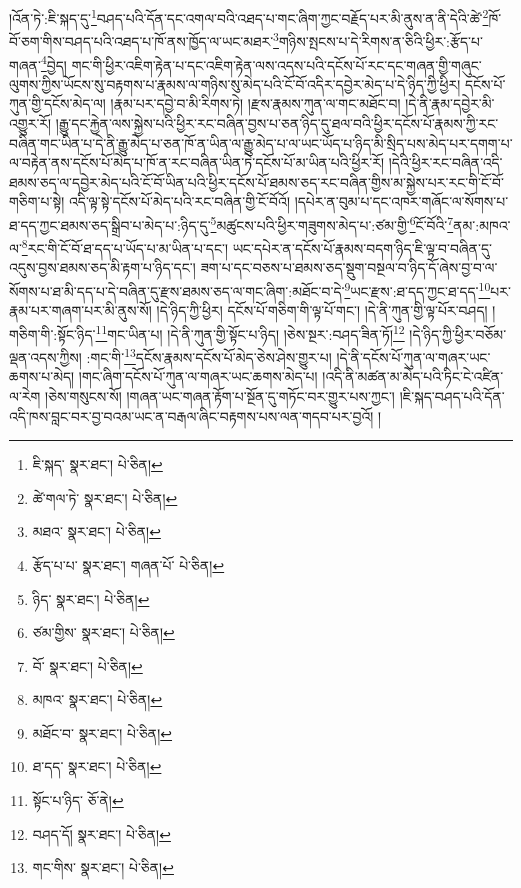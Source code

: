 །འོན་ཏེ་:ཇི་སྐད་དུ་\footnote{ཇི་སྐད་  སྣར་ཐང་།  པེ་ཅིན། }བཤད་པའི་དོན་དང་འགལ་བའི་འཐད་པ་གང་ཞིག་ཀྱང་བརྗོད་པར་མི་ནུས་ན་ནི་དེའི་ཚེ་\footnote{ཚེ་གལ་ཏེ་  སྣར་ཐང་།  པེ་ཅིན། }ཁོ་བོ་ཅག་གིས་བཤད་པའི་འཐད་པ་ཁོ་ནས་ཁྱོད་ལ་ཡང་མཐར་\footnote{མཐའ་  སྣར་ཐང་།  པེ་ཅིན། }གཉིས་སྤངས་པ་དེ་རིགས་ན་ཅིའི་ཕྱིར་:རྩོད་པ་གཞན་\footnote{རྩོད་པ་པ་  སྣར་ཐང་། གཞན་པོ་  པེ་ཅིན། }བྱེད། གང་གི་ཕྱིར་འཇིག་རྟེན་པ་དང་འཇིག་རྟེན་ལས་འདས་པའི་དངོས་པོ་རང་དང་གཞན་གྱི་གཞུང་ལུགས་ཀྱིས་ཡོངས་སུ་བརྟགས་པ་རྣམས་ལ་གཉིས་སུ་མེད་པའི་ངོ་བོ་འདིར་དབྱེར་མེད་པ་དེ་ཉིད་ཀྱི་ཕྱིར། དངོས་པོ་ཀུན་གྱི་དངོས་མེད་ལ། །རྣམ་པར་དབྱེ་བ་མི་རིགས་ཏེ། །རྫས་རྣམས་ཀུན་ལ་གང་མཐོང་བ། །དེ་ནི་རྣམ་དབྱེར་མི་འགྱུར་རོ། །རྒྱུ་དང་རྐྱེན་ལས་སྐྱེས་པའི་ཕྱིར་རང་བཞིན་བྱས་པ་ཅན་ཉིད་དུ་ཐལ་བའི་ཕྱིར་དངོས་པོ་རྣམས་ཀྱི་རང་བཞིན་གང་ཡིན་པ་དེ་ནི་རྒྱུ་མེད་པ་ཅན་ཁོ་ན་ཡིན་ལ་རྒྱུ་མེད་པ་ལ་ཡང་ཡོད་པ་ཉིད་མི་སྲིད་པས་མེད་པར་དགག་པ་ལ་བརྟེན་ནས་དངོས་པོ་མེད་པ་ཁོ་ན་རང་བཞིན་ཡིན་ཏེ་དངོས་པོ་མ་ཡིན་པའི་ཕྱིར་རོ། །དེའི་ཕྱིར་རང་བཞིན་འདི་ཐམས་ཅད་ལ་དབྱེར་མེད་པའི་ངོ་བོ་ཡིན་པའི་ཕྱིར་དངོས་པོ་ཐམས་ཅད་རང་བཞིན་གྱིས་མ་སྐྱེས་པར་རང་གི་ངོ་བོ་གཅིག་པ་སྟེ། འདི་ལྟ་སྟེ་དངོས་པོ་མེད་པའི་རང་བཞིན་གྱི་ངོ་བོའོ། །དཔེར་ན་བུམ་པ་དང་འཁར་གཞོང་ལ་སོགས་པ་ཐ་དད་ཀྱང་ཐམས་ཅད་སྒྲིབ་པ་མེད་པ་:ཉིད་དུ་\footnote{ཉིད་  སྣར་ཐང་།  པེ་ཅིན། }མཚུངས་པའི་ཕྱིར་གཟུགས་མེད་པ་:ཙམ་གྱི་\footnote{ཙམ་གྱིས་  སྣར་ཐང་།  པེ་ཅིན། }ངོ་བོའི་\footnote{བོ་  སྣར་ཐང་།  པེ་ཅིན། }ནམ་:མཁའ་ལ་\footnote{མཁའ་  སྣར་ཐང་།  པེ་ཅིན། }རང་གི་ངོ་བོ་ཐ་དད་པ་ཡོད་པ་མ་ཡིན་པ་དང་། ཡང་དཔེར་ན་དངོས་པོ་རྣམས་བདག་ཉིད་ཇི་ལྟ་བ་བཞིན་དུ་འདུས་བྱས་ཐམས་ཅད་མི་རྟག་པ་ཉིད་དང་། ཟག་པ་དང་བཅས་པ་ཐམས་ཅད་སྡུག་བསྔལ་བ་ཉིད་དོ་ཞེས་བྱ་བ་ལ་སོགས་པ་ཐ་མི་དད་པ་དེ་བཞིན་དུ་རྫས་ཐམས་ཅད་ལ་གང་ཞིག་:མཐོང་བ་དེ་\footnote{མཐོང་བ་  སྣར་ཐང་།  པེ་ཅིན། }ཡང་རྫས་:ཐ་དད་ཀྱང་ཐ་དད་\footnote{ཐ་དད་  སྣར་ཐང་།  པེ་ཅིན། }པར་རྣམ་པར་གཞག་པར་མི་ནུས་སོ། །དེ་ཉིད་ཀྱི་ཕྱིར། དངོས་པོ་གཅིག་གི་ལྟ་པོ་གང་། །དེ་ནི་ཀུན་གྱི་ལྟ་པོར་བཤད། །གཅིག་གི་:སྟོང་ཉིད་\footnote{སྟོང་པ་ཉིད་  ཅོ་ནེ། }གང་ཡིན་པ། །དེ་ནི་ཀུན་གྱི་སྟོང་པ་ཉིད། །ཅེས་སྔར་:བཤད་ཟིན་ཏོ།\footnote{བཤད་དོ།  སྣར་ཐང་།  པེ་ཅིན། } །དེ་ཉིད་ཀྱི་ཕྱིར་བཅོམ་ལྡན་འདས་ཀྱིས། :གང་གི་\footnote{གང་གིས་  སྣར་ཐང་།  པེ་ཅིན། }དངོས་རྣམས་དངོས་པོ་མེད་ཅེས་ཤེས་གྱུར་པ། །དེ་ནི་དངོས་པོ་ཀུན་ལ་གཞར་ཡང་ཆགས་པ་མེད། །གང་ཞིག་དངོས་པོ་ཀུན་ལ་གཞར་ཡང་ཆགས་མེད་པ། །འདི་ནི་མཚན་མ་མེད་པའི་ཏིང་ངེ་འཛིན་ལ་རེག །ཅེས་གསུངས་སོ། །གཞན་ཡང་གཞན་རྟོག་པ་སྔོན་དུ་གཏོང་བར་གྱུར་པས་ཀྱང་། །ཇི་སྐད་བཤད་པའི་དོན་འདི་ཁས་བླང་བར་བྱ་བའམ་ཡང་ན་བརྒལ་ཞིང་བརྟགས་པས་ལན་གདབ་པར་བྱའོ། །
